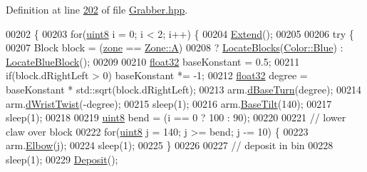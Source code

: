 Definition at line \hyperlink{Grabber_8hpp_source_l00202}{202} of file \hyperlink{Grabber_8hpp_source}{Grabber.\+hpp}.


\begin{DoxyCode}
00202                          \{
00203         \textcolor{keywordflow}{for}(\hyperlink{definitions_8hpp_adde6aaee8457bee49c2a92621fe22b79}{uint8} i = 0; i < 2; i++) \{
00204             \hyperlink{classChipChipArray_1_1Grabber_abecb4047b4f7d5a7e691b7fb581b5a39}{Extend}();
00205 
00206             \textcolor{keywordflow}{try} \{
00207                 Block block = (\hyperlink{classChipChipArray_1_1Grabber_ab57efe6e0b6f369b19528285a278d967}{zone} == \hyperlink{definitions_8hpp_adbd1e7a33d3e1751c7b2aa2562d0ecb9a7fc56270e7a70fa81a5935b72eacbe29}{Zone::A})
00208                     ? \hyperlink{classChipChipArray_1_1Grabber_af49248c957a1695dcde79c0f5f8df99b}{LocateBlocks}(\hyperlink{definitions_8hpp_abc05a0f46084a3477cf5d5c939ff1436a9594eec95be70e7b1710f730fdda33d9}{Color::Blue}) : 
      \hyperlink{classChipChipArray_1_1Grabber_ab9b0d6a64b2c94c0d0f810a5ebeef6ec}{LocateBlueBlock}();
00209 
00210                 \hyperlink{definitions_8hpp_aacdc525d6f7bddb3ae95d5c311bd06a1}{float32} baseKonstant = 0.5;
00211                 \textcolor{keywordflow}{if}(block.dRightLeft > 0) baseKonstant *= -1;
00212                 \hyperlink{definitions_8hpp_aacdc525d6f7bddb3ae95d5c311bd06a1}{float32} degree = baseKonstant * std::sqrt(block.dRightLeft);
00213                 arm.\hyperlink{classChipChipArray_1_1Arm_a980f5bd278cbe06aa21754fb8e0324b3}{dBaseTurn}(degree);
00214                 arm.\hyperlink{classChipChipArray_1_1Arm_a6bde822b1be63926e21222f36aad67b3}{dWristTwist}(-degree);
00215                 sleep(1);
00216                 arm.\hyperlink{classChipChipArray_1_1Arm_a8b077a3791d9fc5ef285c1520fe4c5d8}{BaseTilt}(140);
00217                 sleep(1);
00218 
00219                 \hyperlink{definitions_8hpp_adde6aaee8457bee49c2a92621fe22b79}{uint8} bend = (i == 0 ? 100 : 90);
00220 
00221                 \textcolor{comment}{// lower claw over block}
00222                 \textcolor{keywordflow}{for}(\hyperlink{definitions_8hpp_adde6aaee8457bee49c2a92621fe22b79}{uint8} j = 140; j >= bend; j -= 10) \{
00223                     arm.\hyperlink{classChipChipArray_1_1Arm_ac45149e03abfac230b75156bb42e8417}{Elbow}(j);
00224                     sleep(1);
00225                 \}
00226 
00227                 \textcolor{comment}{// deposit in bin}
00228                 sleep(1);
00229                 \hyperlink{classChipChipArray_1_1Grabber_a44e5aeb908634f68de356ad8df3c4bf1}{Deposit}();

\end{DoxyCode}
